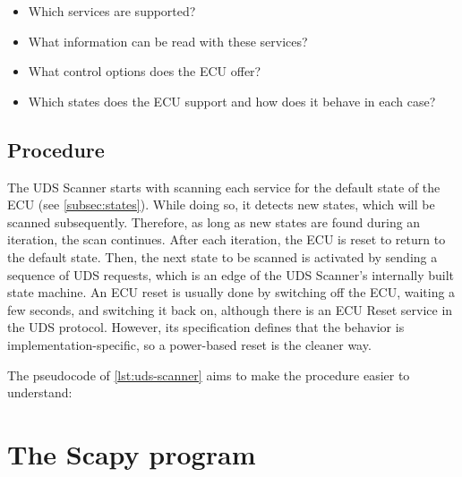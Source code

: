 \begin{itemize}
\item Which services are supported?
\item What information can be read with these services?
\item What control options does the ECU offer?
\item Which states does the ECU support and how does it behave in each case?
\end{itemize}


\subsection{Procedure}

The UDS Scanner starts with scanning each service for the default state of the ECU (see \autoref{subsec:states}). While doing so, it detects new states, which will be scanned subsequently. Therefore, as long as new states are found during an iteration, the scan continues. After each iteration, the ECU is reset to return to the default state. Then, the next state to be scanned is activated by sending a sequence of UDS requests, which is an edge of the UDS Scanner's internally built state machine. An ECU reset is usually done by switching off the ECU, waiting a few seconds, and switching it back on, although there is an ECU Reset service in the UDS protocol. However, its specification defines that the behavior is implementation-specific, so a power-based reset is the cleaner way.

The pseudocode of \autoref{lst:uds-scanner} aims to make the procedure easier to understand:




\section{The Scapy program}
\label{sec:scapy}

